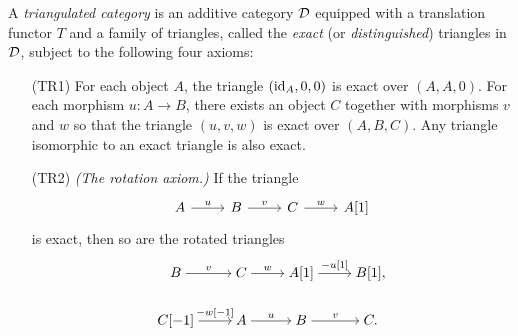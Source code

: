 \begin{definition}
  A \emph{triangulated category} is an additive category
  $\mathcal{D}$ equipped with a translation functor $T$ and a
  family of triangles, called the \emph{exact} (or
  \emph{distinguished}) triangles in $\mathcal{D}$, subject to the
  following four axioms:

  \begin{enumerate}[leftmargin=4.4em]
    \item[(TR1)]
      For each object $A$, the triangle $(\operatorname{id}_A, 0, 0)$ is exact over
      $(A, A, 0)$.
      For each morphism $u: A \to B$, there exists an object $C$
      together with morphisms $v$ and $w$ so that the triangle $(u,
      v, w)$ is exact over $(A, B, C)$.
      Any triangle isomorphic to an exact triangle is also exact.

    \item[(TR2)]
      \emph{(The rotation axiom.)}
      If the triangle
      \[
        \begin{tikzcd}
          A \arrow[r, "u"]
          & B \arrow[r, "v"]
          & C \arrow[r, "w"]
          & A[1]
        \end{tikzcd}
      \]
      is exact, then so are the rotated triangles
      \[
        \begin{tikzcd}[cramped]
          B & C & {A[1]} & {B[1]}, \\
          {C[-1]} & A & B & C.
          \arrow["v", from=1-1, to=1-2]
          \arrow["w", from=1-2, to=1-3]
          \arrow["{-u[1]}", from=1-3, to=1-4]
          \arrow["{-w[-1]}", from=2-1, to=2-2]
          \arrow["u", from=2-2, to=2-3]
          \arrow["v", from=2-3, to=2-4]
        \end{tikzcd}
      \]


\end{enumerate}
\end{definition}

